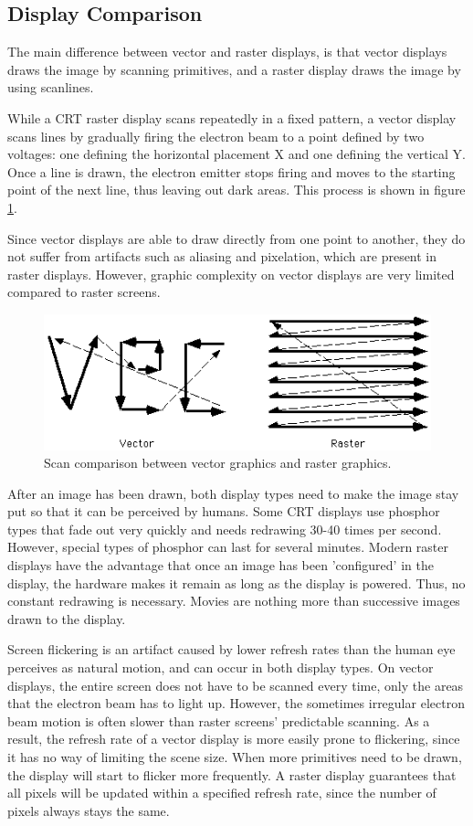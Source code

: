 \subsection{Display Comparison}
The main difference between vector and raster displays, is that vector displays draws the image by scanning primitives, and a raster display draws the image by using scanlines. 

While a CRT raster display scans repeatedly in a fixed pattern, a vector display scans lines by gradually firing the electron beam to a point defined by two voltages: one defining the horizontal placement X and one defining the vertical Y. 
Once a line is drawn, the electron emitter stops firing and moves to the starting point of the next line, thus leaving out dark areas. 
This process is shown in figure \ref{fig:vectorscan}.

Since vector displays are able to draw directly from one point to another, they do not suffer from artifacts such as aliasing and pixelation, which are present in raster displays\cite{vector-monitor}.
However, graphic complexity on vector displays are very limited compared to raster screens.

\begin{figure}[h!]
\centering \includegraphics[width=0.8\linewidth]{images/scan.png}
\caption{Scan comparison between vector graphics and raster graphics\cite{vecvsras}.}
\label{fig:vectorscan}
\end{figure}

After an image has been drawn, both display types need to make the image stay put so that it can be perceived by humans. 
Some CRT displays use phosphor types that fade out very quickly and needs redrawing 30-40 times per second\cite{vector-monitor}.
However, special types of phosphor can last for several minutes.
Modern raster displays have the advantage that once an image has been 'configured' in the display, the hardware makes it remain as long as the display is powered. 
Thus, no constant redrawing is necessary\cite{LCD-persistence}.
Movies are nothing more than successive images drawn to the display.

Screen flickering is an artifact caused by lower refresh rates than the human eye perceives as natural motion, and can occur in both display types. \cite{flicker}
On vector displays, the entire screen does not have to be scanned every time, only the areas that the electron beam has to light up.
However, the sometimes irregular electron beam motion is often slower than raster screens' predictable scanning\cite{vecvsras}.
As a result, the refresh rate of a vector display is more easily prone to flickering, since it has no way of limiting the scene size.
When more primitives need to be drawn, the display will start to flicker more frequently.
A raster display guarantees that all pixels will be updated within a specified refresh rate, since the number of pixels always stays the same.
